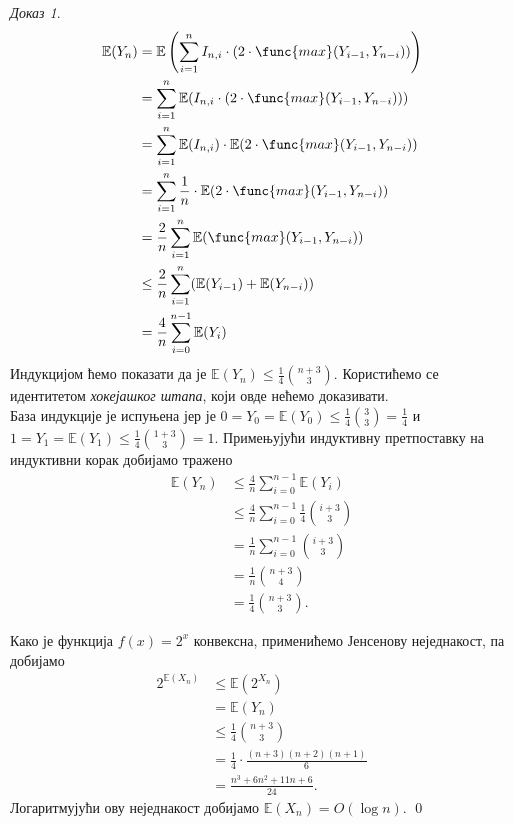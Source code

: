 \documentclass[11pt, a4paper]{article}
\theoremstyle{remark}
\newtheorem*{dokaz}{\selectlanguage{russian} Доказ}
\numberwithin{equation}{section}
\begin{document}
\begin{dokaz}
		\begin{equation}
		\begin{split}
		\mathbb{E}(Y_n) & =\mathbb{E}\left(\sum_{i=1}^{n} I_{n, i} \cdot (2\cdot \func{max}(Y_{i-1}, Y_{n-i})) \right) \\
		& = \sum_{i=1}^{n} \mathbb{E}(I_{n, i} \cdot (2\cdot\func{max}(Y_{i-1}, Y_{n-i})))
		\\
		& = \sum_{i=1}^{n} \mathbb{E}(I_{n, i}) \cdot \mathbb{E}(2\cdot \func{max}(Y_{i-1}, Y_{n-i})) \\
		& = \sum_{i=1}^{n} \frac{1}{n} \cdot \mathbb{E}(2\cdot \func{max}(Y_{i-1}, Y_{n-i})) \\
		& = \frac{2}{n} \sum_{i=1}^{n} \mathbb{E}(\func{max}(Y_{i-1}, Y_{n-i})) \\
		& \leq \frac{2}{n} \sum_{i=1}^{n} (\mathbb{E}(Y_{i-1})+\mathbb{E}(Y_{n-i})) \\
		& = \frac{4}{n} \sum_{i=0}^{n-1} \mathbb{E}(Y_i)
		\end{split}
		\end{equation}
		\noindent Индукцијом ћемо показати да је $\mathbb{E}(Y_n) \leq \frac{1}{4} \binom{n+3}{3}$. Користићемо се идентитетом \textit{хокејашког штапа}, који овде нећемо доказивати. \\
		\indent База индукције је испуњена јер је $0=Y_0=\mathbb{E}(Y_0) \leq \frac{1}{4}\binom{3}{3}=\frac{1}{4}$ и $1=Y_1=\mathbb{E}(Y_1)\leq \frac{1}{4} \binom{1+3}{3}=1$. Примењујући индуктивну претпоставку на индуктивни корак добијамо тражено		
		\begin{equation}
		\begin{split}
		\mathbb{E}(Y_n) & \leq \frac{4}{n}\sum_{i=0}^{n-1} \mathbb{E}(Y_i) \\
		& \leq \frac{4}{n} \sum_{i=0}^{n-1} \frac{1}{4} \binom{i+3}{3}\\
		& = \frac{1}{n} \sum_{i=0}^{n-1} \binom{i+3}{3} \\
		& = \frac{1}{n} \binom{n+3}{4} \\
		& = \frac{1}{4} \binom{n+3}{3}. 
		\end{split}
		\end{equation}
		
		\noindent Како је функција $f(x)=2^x$ конвексна, применићемо Јенсенову неједнакост, па добијамо		
		\begin{equation}
		\begin{split}
		2^{\mathbb{E}(X_n)} & \leq \mathbb{E}\left(2^{X_n} \right) \\
		& = \mathbb{E}(Y_n) \\
		& \leq \frac{1}{4} \binom{n+3}{3} \\
		& = \frac{1}{4} \cdot \frac{(n+3)(n+2)(n+1)}{6} \\
		& = \frac{n^3+6n^2+11n+6}{24}.
		\end{split}
		\end{equation}
		\noindent Логаритмујући ову неједнакост добијамо $\mathbb{E}(X_n)=O(\log n)$. \qed
	\end{dokaz}
\end{document}
